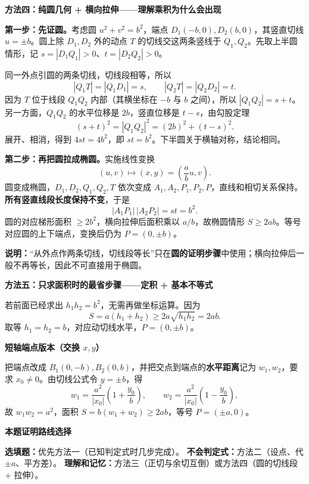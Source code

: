 \begin{proofbox}
\medskip
\textbf{\textcolor{CProof}{方法四：纯圆几何 + 横向拉伸——理解乘积为什么会出现}}

\textbf{第一步：先证圆。}考虑圆 $u^2+v^2=b^2$，端点 $D_1(-b,0),D_2(b,0)$，其竖直切线 $u=\pm b$。圆上除 $D_1,D_2$ 外的动点 $T$ 的切线交这两条竖线于 $Q_1,Q_2$。先取上半圆情形，记 $s=|D_1Q_1|>0$、$t=|D_2Q_2|>0$。

同一外点引圆的两条切线，切线段相等，所以
\[
|Q_1T|=|Q_1D_1|=s,\qquad
|Q_2T|=|Q_2D_2|=t.
\]
因为 $T$ 位于线段 $Q_1Q_2$ 内部（其横坐标在 $-b$ 与 $b$ 之间），所以 $|Q_1Q_2|=s+t$。另一方面，$Q_1Q_2$ 的水平位移是 $2b$，竖直位移是 $t-s$，由勾股定理
\[
(s+t)^2=|Q_1Q_2|^2=(2b)^2+(t-s)^2.
\]
展开、相消，得到 $4st=4b^2$，即 $st=b^2$。下半圆关于横轴对称，结论相同。

\textbf{第二步：再把圆拉成椭圆。}实施线性变换
\[
(u,v)\mapsto(x,y)=\left(\frac ab u,v\right).
\]
圆变成椭圆，$D_1,D_2,Q_1,Q_2,T$ 依次变成 $A_1,A_2,P_1,P_2,P$，直线和相切关系保持。\textbf{所有竖直线段长度保持不变}，于是
\[
|A_1P_1|\,|A_2P_2|=st=b^2.
\]
圆的对应梯形面积 $\ge2b^2$，横向拉伸后面积乘以 $a/b$，故椭圆情形 $S\ge2ab$。等号对应圆的上下端点，变换后仍为 $P=(0,\pm b)$。

\textbf{说明：}“从外点作两条切线，切线段等长”只在\textbf{圆的证明步骤}中使用；横向拉伸后一般不再等长，因此不可直接用于椭圆。

\medskip
\textbf{\textcolor{CProof}{方法五：只求面积时的最省步骤——定积 + 基本不等式}}

若前面已经求出 $h_1h_2=b^2$，无需再做坐标运算。因为
\[
S=a(h_1+h_2)\ge2a\sqrt{h_1h_2}=2ab.
\]
取等 $h_1=h_2=b$，对应动切线水平，$P=(0,\pm b)$。

\medskip
\textbf{\textcolor{CProof}{短轴端点版本（交换 $x,y$）}}

把端点改成 $B_1(0,-b),B_2(0,b)$，并把交点到端点的\textbf{水平距离}记为 $w_1,w_2$，要求 $x_0\ne0$。由切线公式令 $y=\pm b$，得
\[
w_1=\frac{a^2}{|x_0|}\left(1+\frac{y_0}{b}\right),\qquad
w_2=\frac{a^2}{|x_0|}\left(1-\frac{y_0}{b}\right),
\]
故 $w_1w_2=a^2$，面积 $S=b(w_1+w_2)\ge2ab$，等号 $P=(\pm a,0)$。

\medskip
\textbf{\textcolor{CProof}{本题证明路线选择}}

\textbf{选填题：}优先方法一（已知判定式时几步完成）。\quad
\textbf{不会判定式：}方法二（设点、代 $\pm a$、平方差）。\quad
\textbf{理解和记忆：}方法三（正切与余切互倒）或方法四（圆的切线段 + 拉伸）。
\end{proofbox}
